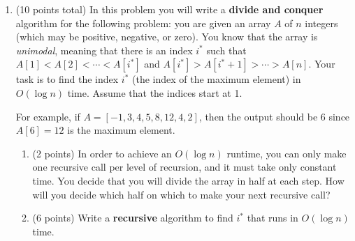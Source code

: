 \documentclass[11pt]{article}
\begin{document}
\begin{enumerate}
\begin{enumerate}[(a)]
\item (2 points) What is the overall non-recursive runtime of the recurrence?

\vspace{1in}
\end{enumerate}

\item (10 points total) In this problem you will write a \textbf{divide and conquer} algorithm for the following problem: you
are given an array $A$ of $n$ integers (which may be positive, negative, or zero).
You know that the array is \emph{unimodal}, meaning that there is an index $i^*$ such that
$A[1] < A[2] < \cdots < A[i^*]$ and $A[i^*] > A[i^* + 1] > \cdots > A[n]$.
Your task is to find the index $i^*$ (the index of the maximum element) in $O(\log n)$ time.
Assume that the indices start at 1.

For example, if $A = [-1, 3, 4, 5, 8, 12, 4, 2]$, then the output should be $6$ since
$A[6] = 12$ is the maximum element.

\begin{enumerate}

    \item (2 points) In order to achieve an $O(\log n)$ runtime, you can only make one recursive
    call per level of recursion, and it must take only constant time. You decide that you will divide
    the array in half at each step. How will you decide which half on which to make your next recursive call?
    \vspace{2in}

    \item (6 points) Write a \textbf{recursive} algorithm to find $i^*$ that runs in $O(\log n)$ time.


\end{enumerate}
\end{enumerate}
\end{document}
